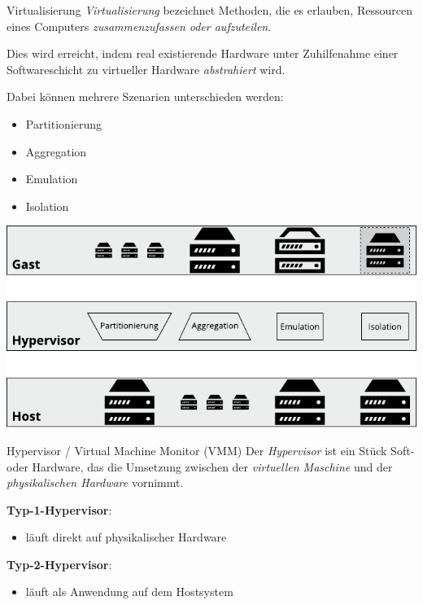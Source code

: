 \documentclass[german]{spicker}
\begin{document}
\begin{defi}{Virtualisierung}
    \emph{Virtualisierung} bezeichnet Methoden, die es erlauben, Ressourcen
    eines Computers \emph{zusammenzufassen oder aufzuteilen}.

    Dies wird erreicht, indem real existierende Hardware unter
    Zuhilfenahme einer Softwareschicht zu virtueller Hardware \emph{abstrahiert} wird.

    Dabei können mehrere Szenarien unterschieden werden:
    \begin{itemize}
        \item Partitionierung
        \item Aggregation
        \item Emulation
        \item Isolation
    \end{itemize}
    \vspace{1em}
    \begin{center}
        \includegraphics[]{images/virtualisierung.pdf}
    \end{center}
\end{defi}

\begin{defi}{Hypervisor / Virtual Machine Monitor (VMM)}
    Der \emph{Hypervisor} ist ein Stück Soft- oder Hardware, das  die Umsetzung
    zwischen der \emph{virtuellen Maschine} und der \emph{physikalischen Hardware} vornimmt.

    \textbf{Typ-1-Hypervisor}:
    \begin{itemize}
        \item läuft direkt auf physikalischer Hardware
    \end{itemize}

    \textbf{Typ-2-Hypervisor}:
    \begin{itemize}
        \item läuft als Anwendung auf dem Hostsystem
    \end{itemize}
\end{defi}
\end{document}

